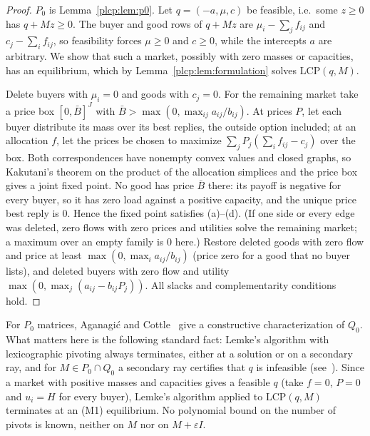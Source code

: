 \begin{proof}
$P_0$ is Lemma~\ref{plcp:lem:p0}. Let $q=(-a,\mu,c)$ be feasible, i.e.\ some $z\ge0$ has $q+Mz\ge0$.
The buyer and good rows of $q+Mz$ are $\mu_i-\sum_jf_{ij}$ and $c_j-\sum_if_{ij}$, so feasibility forces
$\mu\ge0$ and $c\ge0$, while the intercepts $a$ are arbitrary. We show that such a market, possibly with
zero masses or capacities, has an equilibrium, which by Lemma~\ref{plcp:lem:formulation} solves
$\mathrm{LCP}(q,M)$.

Delete buyers with $\mu_i=0$ and goods with $c_j=0$. For the remaining market take a price box
$[0,\bar B]^J$ with $\bar B>\max(0,\max_{ij}a_{ij}/b_{ij})$. At prices $P$, let each buyer distribute its
mass over its best replies, the outside option included; at an allocation $f$, let the prices be chosen to
maximize $\sum_jP_j(\sum_if_{ij}-c_j)$ over the box. Both correspondences have nonempty convex values and
closed graphs, so Kakutani's theorem on the product of the allocation simplices and the price box gives a
joint fixed point. No good has price $\bar B$ there: its payoff is negative for every buyer, so it has
zero load against a positive capacity, and the unique price best reply is $0$. Hence the fixed point
satisfies (a)--(d). (If one side or every edge was deleted, zero flows with zero prices and utilities
solve the remaining market; a maximum over an empty family is $0$ here.) Restore deleted goods with zero
flow and price at least $\max(0,\max_ia_{ij}/b_{ij})$ (price zero for a good that no buyer lists),
and deleted buyers with zero flow and utility $\max(0,\max_j(a_{ij}-b_{ij}P_j))$. All slacks and
complementarity conditions hold.
\end{proof}

For $P_0$ matrices, Aganagi\'c and Cottle~\cite{ac87} give a constructive characterization of $Q_0$.
What matters here is the following standard fact: Lemke's algorithm with lexicographic pivoting always
terminates, either at a solution or on a secondary ray, and for $M\in P_0\cap Q_0$ a secondary ray
certifies that $q$ is infeasible (see~\cite[\S2, Remarks~2 and~5]{av13}). Since a market with positive
masses and capacities gives a feasible $q$ (take $f=0$, $P=0$ and $u_i=H$ for every buyer), Lemke's algorithm applied to $\mathrm{LCP}(q,M)$
terminates at an (M1) equilibrium. No polynomial bound on the number of pivots is known, neither on $M$
nor on $M+\varepsilon I$.

